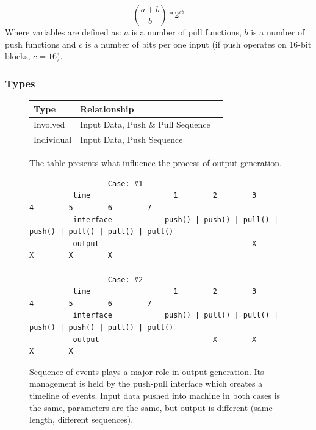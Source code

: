\documentclass[twocolumn, a4paper, 10pt]{article}
\begin{document}
$$\binom{a + b}{b} * 2^{cb}$$\newline
Where variables are defined as: $a$ is a number of pull functions, $b$ is a number of push functions and $c$ is a number of bits per one input (if push operates on 16-bit blocks, $c = 16$).

\subsubsection{Types}

\begin{figure}[ht]
  \centering
  \begin{tabular}{l*{1}{l}r}
    Type & Relationship \\
    \hline
    Involved   & Input Data, Push \& Pull Sequence \\
    Individual & Input Data, Push Sequence
  \end{tabular}
  \caption{The table presents what influence the process of output generation.}
  \label{fig:table-types}
\end{figure}

\begin{figure}[ht]
\begin{verbatim}
                  Case: #1
          time                   1        2        3        4        5        6        7
          interface            push() | push() | pull() | push() | pull() | pull() | pull()
          output                                   X                 X        X        X

                  Case: #2
          time                   1        2        3        4        5        6        7
          interface            push() | pull() | pull() | push() | push() | pull() | pull()
          output                          X        X                          X        X
\end{verbatim}
  \caption{Sequence of events plays a major role in output generation. Its management is held by the push-pull interface which creates a timeline of events. Input data pushed into machine in both cases is the same, parameters are the same, but output is different (same length, different sequences).}
  \label{fig:interface-order}
\end{figure}
\end{document}
